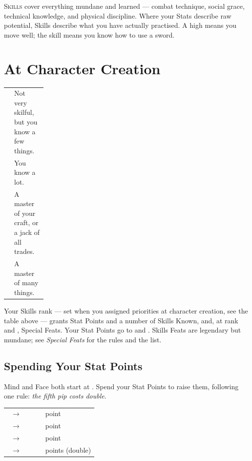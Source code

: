 
\lettrine{S}{kills} cover everything mundane and learned --- combat
technique, social grace, technical knowledge, and physical discipline.
Where your Stats describe raw potential, Skills describe what you have
actually practised. A high  means you move well; the
 skill means you know how to use a sword.

\section{At Character Creation}

\begin{statblock}
\begin{tabularx}{\linewidth}{@{}p{0.16\linewidth} Y@{}}
 & Not very skilful, but you know a few things.\\[3pt]
 & You know a lot.\\[3pt]
 & A master of your craft, or a jack of all trades.\\[3pt]
 & A master of many things.\\
\end{tabularx}
\end{statblock}

Your Skills rank --- set when you assigned priorities at character
creation, see the table above --- grants Stat Points and a number of
Skills Known, and, at rank  and , Special Feats.
Your Stat Points go to  and . Skills
Feats are legendary but mundane; see \emph{Special Feats} for the rules
and the list.

\subsection*{Spending Your Stat Points}
Mind and Face both start at . Spend your Stat Points to raise
them, following one rule: \emph{the fifth pip costs double}.

\begin{statblock}
\begin{tabularx}{\linewidth}{@{}p{0.42\linewidth} Y@{}}
~$\to$~ &  point\\[2pt]
~$\to$~ &  point\\[2pt]
~$\to$~ &  point\\[2pt]
~$\to$~ &  points (double)\\
\end{tabularx}
\end{statblock}

